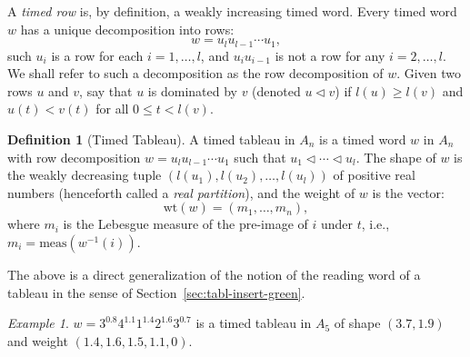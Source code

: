 \documentclass[10pt]{amsproc}
\theoremstyle{definition}
\newtheorem{definition}[theorem]{Definition}
\theoremstyle{remark}
\newtheorem{example}[theorem]{Example}
\newcommand{\wt}{\mathrm{wt}}
\begin{document}
A \emph{timed row} is, by definition, a weakly increasing timed word.
Every timed word $w$ has a unique decomposition into rows:
\begin{displaymath}
  w = u_l u_{l-1}\dotsb u_1,
\end{displaymath}
such $u_i$ is a row for each $i=1,\dotsc,l$, and $u_iu_{i-1}$ is not a row for any $i=2,\dotsc,l$.
We shall refer to such a decomposition as the row decomposition of $w$.
Given two rows $u$ and $v$, say that $u$ is dominated by $v$ (denoted $u\lhd v$) if $l(u)\geq l(v)$ and $u(t)<v(t)$ for all $0\leq t<l(v)$.
\begin{definition}[Timed Tableau]\label{definition:timed-tableau}
  A timed tableau in $A_n$ is a timed word $w$ in $A_n$ with row decomposition $w=u_l u_{l-1}\dotsb u_1$ such that $u_1\lhd \dotsb \lhd u_l$.
  The shape of $w$ is the weakly decreasing tuple $(l(u_1),l(u_2),\dotsc,l(u_l))$ of positive real numbers (henceforth called a \emph{real partition}), and the weight of $w$ is the vector:
  \begin{displaymath}
    \wt(w) = (m_1,\dotsc,m_n),
  \end{displaymath}
where $m_i$ is the Lebesgue measure of the pre-image of $i$ under $t$, i.e., $m_i=\mathrm{meas}(w^{-1}(i))$.
\end{definition}
The above is a direct generalization of the notion of the reading word of a tableau in the sense of Section~\ref{sec:tabl-insert-green}.
\begin{example}
  \label{example:timed-tableau}
  $w=3^{0.8}4^{1.1}1^{1.4}2^{1.6}3^{0.7}$ is a timed tableau in $A_5$ of shape $(3.7,1.9)$ and weight $(1.4, 1.6, 1.5, 1.1,0)$.
\end{example}
\end{document}
